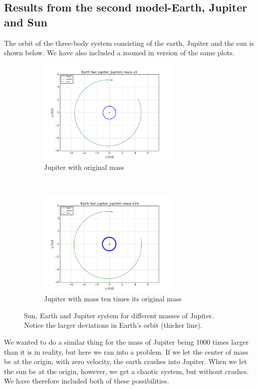 \documentclass[a4paper, 10pt]{article}
\begin{document}
\subsection{Results from the second model-Earth, Jupiter and Sun}
The orbit of the three-body system consisting of the earth, Jupiter and the sun is shown below. We have also included a zoomed in version of the same plots.\\
\begin{figure}[!ht]
    \centering
    \begin{subfigure}[H!]{0.5\textwidth}
        \centering
        \includegraphics[height=2.0in]{orbitESJ1.png}
        \caption{Jupiter with original mass}
    \end{subfigure}%
    ~ 
    \begin{subfigure}[H!]{0.5\textwidth}
        \centering
        \includegraphics[height=2.0in]{orbitESJ10.png}
        \caption{Jupiter with mass ten times its original mass}
    \end{subfigure}
    \caption{Sun, Earth and Jupiter system for different masses of Jupiter. Notice the larger deviations in Earth's orbit (thicker line).} \label{fig:jupiter1-10}
\end{figure}
\linebreak
We wanted to do a similar thing for the mass of Jupiter being 1000 times larger than it is in reality, but here we ran into a problem. If we let the center of mass be at the origin, with zero velocity, the earth crashes into Jupiter. When we let the sun be at the origin, however, we get a chaotic system, but without crashes. We have therefore included both of these possibilities.
\end{document}
